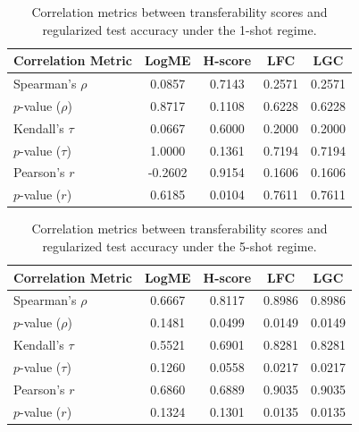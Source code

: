 \begin{table}[htbp]
\centering
\caption{Correlation metrics between transferability scores and regularized test accuracy under the 1-shot regime.}
\label{tab:correlation_metrics_1_shot}
\begin{tabular}{lcccc}
\hline
\textbf{Correlation Metric} & \textbf{LogME} & \textbf{H-score} & \textbf{LFC} & \textbf{LGC} \\ \hline
Spearman's $\rho$ & 0.0857 & 0.7143 & 0.2571 & 0.2571 \\
$p$-value ($\rho$) & 0.8717 & 0.1108 & 0.6228 & 0.6228 \\
Kendall's $\tau$ & 0.0667 & 0.6000 & 0.2000 & 0.2000 \\
$p$-value ($\tau$) & 1.0000 & 0.1361 & 0.7194 & 0.7194 \\
Pearson's $r$ & -0.2602 & 0.9154 & 0.1606 & 0.1606 \\
$p$-value ($r$) & 0.6185 & 0.0104 & 0.7611 & 0.7611 \\
\hline
\end{tabular}
\end{table}


\begin{table}[htbp]
\centering
\caption{Correlation metrics between transferability scores and regularized test accuracy under the 5-shot regime.}
\label{tab:correlation_metrics_5_shot}
\begin{tabular}{lcccc}
\hline
\textbf{Correlation Metric} & \textbf{LogME} & \textbf{H-score} & \textbf{LFC} & \textbf{LGC} \\ \hline
Spearman's $\rho$ & 0.6667 & 0.8117 & 0.8986 & 0.8986 \\
$p$-value ($\rho$) & 0.1481 & 0.0499 & 0.0149 & 0.0149 \\
Kendall's $\tau$ & 0.5521 & 0.6901 & 0.8281 & 0.8281 \\
$p$-value ($\tau$) & 0.1260 & 0.0558 & 0.0217 & 0.0217 \\
Pearson's $r$ & 0.6860 & 0.6889 & 0.9035 & 0.9035 \\
$p$-value ($r$) & 0.1324 & 0.1301 & 0.0135 & 0.0135 \\
\hline
\end{tabular}
\end{table}


